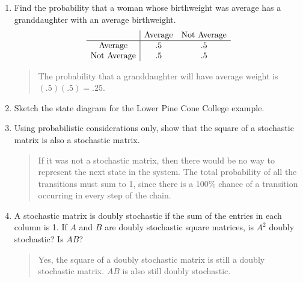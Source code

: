 \documentclass{hw}
\begin{document}
\begin{enumerate}
\item Find the probability that a woman whose birthweight was average has a granddaughter with an
average birthweight.
\[
\begin{array}{c | c c}
& \text{Average} & \text{Not Average}\\
\hline
\text{Average} & .5 & .5\\
\text{Not Average} & .5 & .5
\end{array}
\]
\begin{quote}
The probability that a granddaughter will have average weight is $(.5)(.5)=.25$.
\end{quote}

\item Sketch the state diagram for the Lower Pine Cone College example.
\begin{center}
\end{center}

\setcounter{enumi}{10}

\item Using probabilistic considerations only, show that the square of a stochastic matrix is also a
stochastic matrix.
\begin{quote}
If it was not a stochastic matrix, then there would be no way to represent the next state in the
system. The total probability of all the transitions must sum to 1, since there is a 100\% chance
of a transition occurring in every step of the chain.
\end{quote}

\item A stochastic matrix is doubly stochastic if the sum of the entries in each column is 1. If $A$
and $B$ are doubly stochastic square matrices, is $A^{2}$ doubly stochastic? Is $AB$?
\begin{quote}
Yes, the square of a doubly stochastic matrix is still a doubly stochastic matrix. $AB$ is also
still doubly stochastic.
\end{quote}


\end{enumerate}
\end{document}

